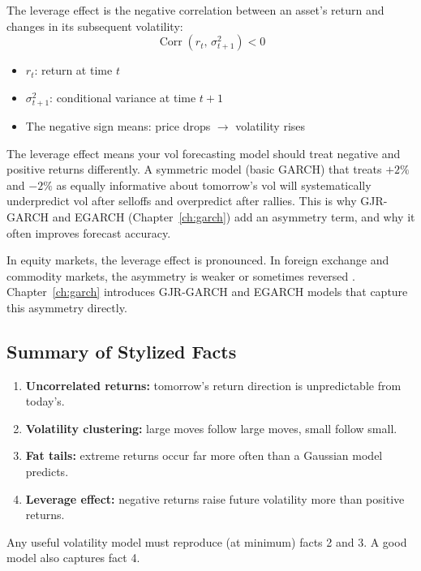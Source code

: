\begin{definition}
The leverage effect is the negative correlation between an asset's return and changes in its subsequent volatility:
\begin{equation}
  \operatorname{Corr}(r_t,\, \sigma_{t+1}^2) < 0
  \label{eq:leverage-effect}
\end{equation}
\begin{itemize}[nosep]
  \item $r_t$: return at time $t$
  \item $\sigma_{t+1}^2$: conditional variance at time $t+1$
  \item The negative sign means: price drops $\to$ volatility rises
\end{itemize}

\begin{projectconnection}
The leverage effect means your vol forecasting model should treat negative and positive returns differently.
A symmetric model (basic GARCH) that treats $+2\%$ and $-2\%$ as equally informative about tomorrow's vol will systematically underpredict vol after selloffs and overpredict after rallies.
This is why GJR-GARCH and EGARCH (Chapter~\ref{ch:garch}) add an asymmetry term, and why it often improves forecast accuracy.
\end{projectconnection}
\end{definition}

In equity markets, the leverage effect is pronounced.
In foreign exchange and commodity markets, the asymmetry is weaker or sometimes reversed \citep{Cont2001}.
Chapter~\ref{ch:garch} introduces GJR-GARCH and EGARCH models that capture this asymmetry directly.

\subsection{Summary of Stylized Facts}

\begin{keyidea}
\begin{enumerate}[nosep]
  \item \textbf{Uncorrelated returns:} tomorrow's return direction is unpredictable from today's.
  \item \textbf{Volatility clustering:} large moves follow large moves, small follow small.
  \item \textbf{Fat tails:} extreme returns occur far more often than a Gaussian model predicts.
  \item \textbf{Leverage effect:} negative returns raise future volatility more than positive returns.
\end{enumerate}
Any useful volatility model must reproduce (at minimum) facts 2 and 3.
A good model also captures fact 4.
\end{keyidea}

